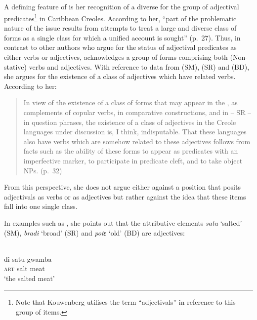 \subsection{\citet{Kouwenberg1996}}\label{sec:3.1.2}

A defining feature of \citet{Kouwenberg1996} is her recognition of a
diverse  for the group of adjectival predicates\footnote{Note
  that Kouwenberg utilises the term ``adjectivals'' in reference to this
  group of items.}  in Caribbean Creoles.  According to
her, ``part of the problematic nature of the issue results from
attempts to treat a large and diverse class of forms as a single class
for which a unified account is sought” (p.~27).  Thus, in contrast to
other authors who argue for the status of adjectival predicates as
either verbs or adjectives, \citet{Kouwenberg1996} acknowledges a
group of forms comprising both (Non-stative) verbs and adjectives.
With reference to data from  (SM),  (SR) and 
 (BD), she argues for the existence of a class of
adjectives which have related verbs.  According to her:

\begin{quote}
In view of the existence of a class of forms that may appear in the
, as complements of copular verbs, in comparative
constructions, and in -- SR -- in question phrases, the existence of a
class of adjectives in the Creole languages under discussion is, I
think, indisputable.  That these languages also have verbs which are
somehow related to these adjectives follows from facts such as the
ability of these forms to appear as predicates with an imperfective
marker, to participate in predicate cleft, and to take object NPs.
(p.~32)
\end{quote}

From this perspective, she does not argue either against a position
that posits adjectivals as verbs or as adjectives but rather against
the idea that these items fall into one single class.

In examples such as , she points out that the attributive
elements \textit{satu} `salted' (SM), \textit{bradi} `broad' (SR) and
\textit{potɛ} `old' (BD) are adjectives:

\ea%
\label{ex:3:12}
\ea
{} \\
\gll        di satu gwamba \\
	\textsc{art} salt meat  \\
\glt     `the salted meat'


